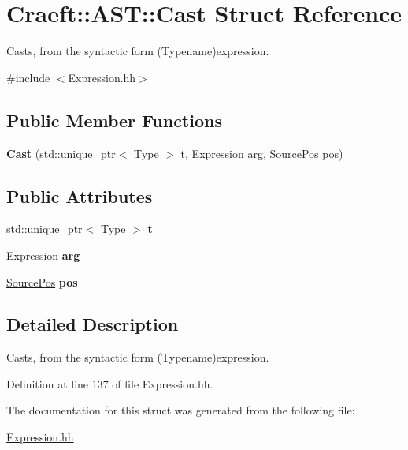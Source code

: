 \hypertarget{struct_craeft_1_1_a_s_t_1_1_cast}{}\section{Craeft\+:\+:A\+ST\+:\+:Cast Struct Reference}
\label{struct_craeft_1_1_a_s_t_1_1_cast}


Casts, from the syntactic form (Typename)expression.  




{\ttfamily \#include $<$Expression.\+hh$>$}

\subsection*{Public Member Functions}
\begin{DoxyCompactItemize}
\item 
\hypertarget{struct_craeft_1_1_a_s_t_1_1_cast_ab79620730fc07cc380283f7e6e604386}{}\label{struct_craeft_1_1_a_s_t_1_1_cast_ab79620730fc07cc380283f7e6e604386} 
{\bfseries Cast} (std\+::unique\+\_\+ptr$<$ Type $>$ t, \hyperlink{_expression_8hh_aef28cabf6d8e7cb8324232e27e69606d}{Expression} arg, \hyperlink{struct_craeft_1_1_source_pos}{Source\+Pos} pos)
\end{DoxyCompactItemize}
\subsection*{Public Attributes}
\begin{DoxyCompactItemize}
\item 
\hypertarget{struct_craeft_1_1_a_s_t_1_1_cast_a82df15337155e1d0aeec6c41196977fd}{}\label{struct_craeft_1_1_a_s_t_1_1_cast_a82df15337155e1d0aeec6c41196977fd} 
std\+::unique\+\_\+ptr$<$ Type $>$ {\bfseries t}
\item 
\hypertarget{struct_craeft_1_1_a_s_t_1_1_cast_a64862fda4902db196344900dc2ac7a07}{}\label{struct_craeft_1_1_a_s_t_1_1_cast_a64862fda4902db196344900dc2ac7a07} 
\hyperlink{_expression_8hh_aef28cabf6d8e7cb8324232e27e69606d}{Expression} {\bfseries arg}
\item 
\hypertarget{struct_craeft_1_1_a_s_t_1_1_cast_a16f9f448dcd013ae9b4c7dc68f64029b}{}\label{struct_craeft_1_1_a_s_t_1_1_cast_a16f9f448dcd013ae9b4c7dc68f64029b} 
\hyperlink{struct_craeft_1_1_source_pos}{Source\+Pos} {\bfseries pos}
\end{DoxyCompactItemize}


\subsection{Detailed Description}
Casts, from the syntactic form (Typename)expression. 

Definition at line 137 of file Expression.\+hh.



The documentation for this struct was generated from the following file\+:\begin{DoxyCompactItemize}
\item 
\hyperlink{_expression_8hh}{Expression.\+hh}\end{DoxyCompactItemize}
